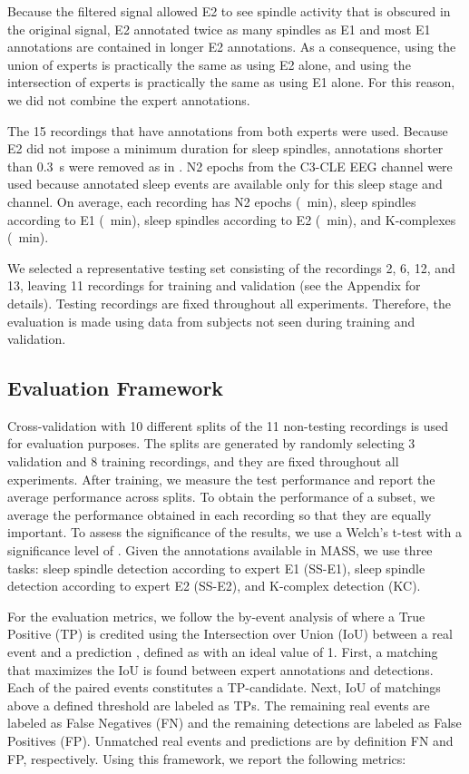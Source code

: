 \documentclass[conference]{IEEEtran}
\begin{document}
Because the filtered signal allowed E2 to see spindle activity that is obscured in the original signal, E2 annotated twice as many spindles as E1 and most E1 annotations are contained in longer E2 annotations. As a consequence, using the union of experts is practically the same as using E2 alone, and using the intersection of experts is practically the same as using E1 alone. For this reason, we did not combine the expert annotations.

The 15 recordings that have annotations from both experts were used. Because E2 did not impose a minimum duration for sleep spindles, annotations shorter than 0.3~s were removed as in \cite{warby2014sleep}. N2 epochs from the C3-CLE EEG channel were used because annotated sleep events are available only for this sleep stage and channel. On average, each recording has  N2 epochs (~min),  sleep spindles according to E1 (~min),  sleep spindles according to E2 (~min), and  K-complexes (~min).

We selected a representative testing set consisting of the recordings 2, 6, 12, and 13, leaving 11 recordings for training and validation (see the Appendix for details). Testing recordings are fixed throughout all experiments. Therefore, the evaluation is made using data from subjects not seen during training and validation.


\subsection{Evaluation Framework}
\label{sec:eval}

Cross-validation with 10 different splits of the 11 non-testing recordings is used for evaluation purposes. The splits are generated by randomly selecting 3 validation and 8 training recordings, and they are fixed throughout all experiments. After training, we measure the test performance and report the average performance across splits. To obtain the performance of a subset, we average the performance obtained in each recording so that they are equally important. To assess the significance of the results, we use a Welch's t-test \cite{welch1947generalization} with a significance level of . Given the annotations available in MASS, we use three tasks: sleep spindle detection according to expert E1 (SS-E1), sleep spindle detection according to expert E2 (SS-E2), and K-complex detection (KC).

For the evaluation metrics, we follow the by-event analysis of \cite{warby2014sleep} where a True Positive (TP) is credited using the Intersection over Union (IoU) between a real event  and a prediction , defined as
with an ideal value of 1. First, a matching that maximizes the IoU is found between expert annotations and detections. Each of the paired events constitutes a TP-candidate. Next, IoU of matchings above a defined threshold are labeled as TPs. The remaining real events are labeled as False Negatives (FN) and the remaining detections are labeled as False Positives (FP). Unmatched real events and predictions are by definition FN and FP, respectively. Using this framework, we report the following metrics:
\end{document}
